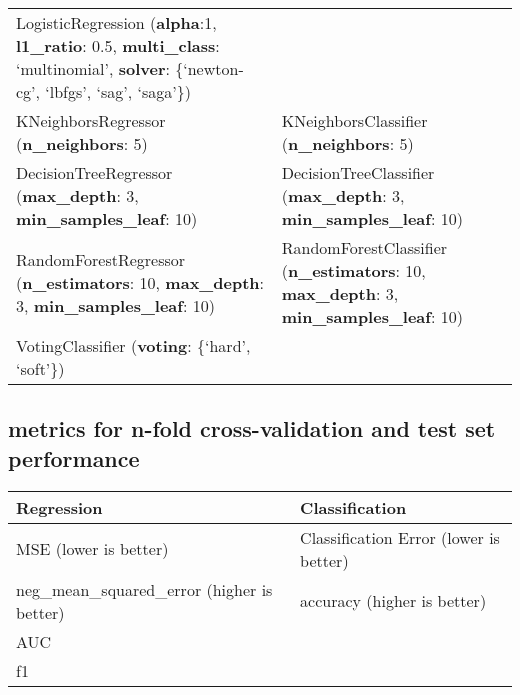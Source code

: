 \documentclass[11pt]{article}
\begin{document}
\begin{longtable}[]{@{}ll@{}}
\begin{minipage}[t]{0.47\columnwidth}
LogisticRegression {(\textbf{alpha}:1, \textbf{l1\_ratio}: 0.5,
\textbf{multi\_class}: `multinomial', \textbf{solver}: \{`newton-cg',
`lbfgs', `sag', `saga'\})}\strut
\end{minipage}\tabularnewline
\begin{minipage}[t]{0.47\columnwidth}\raggedright
KNeighborsRegressor {(\textbf{n\_neighbors}: 5)}\strut
\end{minipage} & \begin{minipage}[t]{0.47\columnwidth}\raggedright
KNeighborsClassifier {(\textbf{n\_neighbors}: 5)}\strut
\end{minipage}\tabularnewline
\begin{minipage}[t]{0.47\columnwidth}\raggedright
DecisionTreeRegressor {(\textbf{max\_depth}: 3,
\textbf{min\_samples\_leaf}: 10)}\strut
\end{minipage} & \begin{minipage}[t]{0.47\columnwidth}\raggedright
DecisionTreeClassifier {(\textbf{max\_depth}: 3,
\textbf{min\_samples\_leaf}: 10)}\strut
\end{minipage}\tabularnewline
\begin{minipage}[t]{0.47\columnwidth}\raggedright
RandomForestRegressor {(\textbf{n\_estimators}: 10, \textbf{max\_depth}:
3, \textbf{min\_samples\_leaf}: 10)}\strut
\end{minipage} & \begin{minipage}[t]{0.47\columnwidth}\raggedright
RandomForestClassifier {(\textbf{n\_estimators}: 10,
\textbf{max\_depth}: 3, \textbf{min\_samples\_leaf}: 10)}\strut
\end{minipage}\tabularnewline
\begin{minipage}[t]{0.47\columnwidth}\raggedright
VotingClassifier {(\textbf{voting}: \{`hard', `soft'\})}\strut
\end{minipage}\tabularnewline
\bottomrule
\end{longtable}

    \hypertarget{metrics-for-n-fold-cross-validation-and-test-set-performance}{%
\subsection{metrics for n-fold cross-validation and test set
performance}\label{metrics-for-n-fold-cross-validation-and-test-set-performance}}

\begin{longtable}[]{@{}ll@{}}
\toprule
\textbf{Regression} & \textbf{Classification}\tabularnewline
\midrule
\endhead
MSE (lower is better) & Classification Error (lower is
better)\tabularnewline
neg\_mean\_squared\_error (higher is better) & accuracy (higher is
better)\tabularnewline
AUC\tabularnewline
f1\tabularnewline
\bottomrule
\end{longtable}
\end{document}

